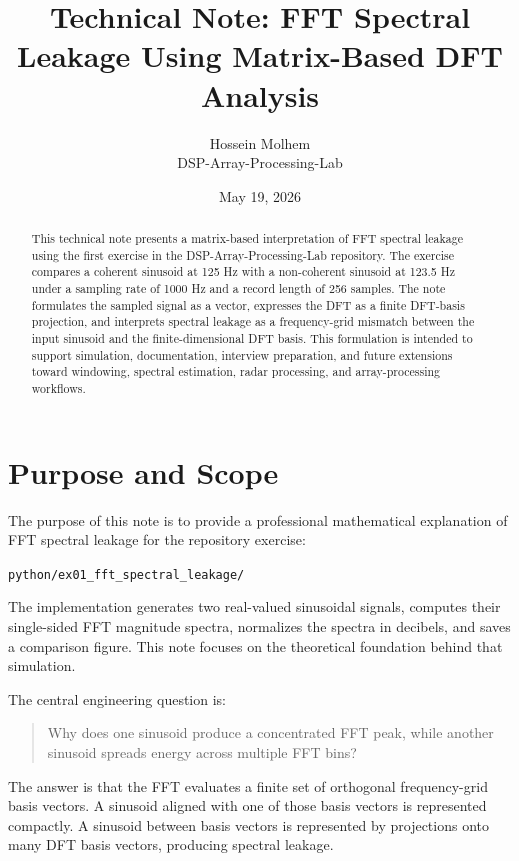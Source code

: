 ﻿\documentclass[11pt]{article}
\title{\textbf{Technical Note: FFT Spectral Leakage Using Matrix-Based DFT Analysis}}
\author{Hossein Molhem\\DSP-Array-Processing-Lab}
\date{May 19, 2026}
\begin{document}
\maketitle

\begin{abstract}
This technical note presents a matrix-based interpretation of FFT spectral leakage using the first exercise in the DSP-Array-Processing-Lab repository. The exercise compares a coherent sinusoid at 125 Hz with a non-coherent sinusoid at 123.5 Hz under a sampling rate of 1000 Hz and a record length of 256 samples. The note formulates the sampled signal as a vector, expresses the DFT as a finite DFT-basis projection, and interprets spectral leakage as a frequency-grid mismatch between the input sinusoid and the finite-dimensional DFT basis. This formulation is intended to support simulation, documentation, interview preparation, and future extensions toward windowing, spectral estimation, radar processing, and array-processing workflows.
\end{abstract}

\section{Purpose and Scope}

The purpose of this note is to provide a professional mathematical explanation of FFT spectral leakage for the repository exercise:

\begin{center}
\texttt{python/ex01\_fft\_spectral\_leakage/}
\end{center}

The implementation generates two real-valued sinusoidal signals, computes their single-sided FFT magnitude spectra, normalizes the spectra in decibels, and saves a comparison figure. This note focuses on the theoretical foundation behind that simulation.

The central engineering question is:

\begin{quote}
Why does one sinusoid produce a concentrated FFT peak, while another sinusoid spreads energy across multiple FFT bins?
\end{quote}

The answer is that the FFT evaluates a finite set of orthogonal frequency-grid basis vectors. A sinusoid aligned with one of those basis vectors is represented compactly. A sinusoid between basis vectors is represented by projections onto many DFT basis vectors, producing spectral leakage.
\end{document}
